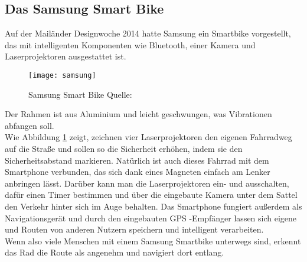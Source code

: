 \subsection{Das Samsung Smart Bike}
Auf der Mailänder Designwoche 2014 hatte Samsung ein Smartbike vorgestellt, das mit intelligenten Komponenten wie Bluetooth, einer Kamera und Laserprojektoren ausgestattet ist.\\ 
\begin{figure}[H]
    \centering
    \texttt{[image: samsung]}
    \grayRule
    \caption[Samsung Smart Bike]{Samsung Smart Bike  Quelle: \cite{smartbike}} 
    \label{fig:samsung}
\end{figure}
Der Rahmen ist aus Aluminium und leicht geschwungen, was Vibrationen abfangen soll.\\
Wie Abbildung \ref{fig:samsung} zeigt, zeichnen vier Laserprojektoren den eigenen Fahrradweg auf die Straße und sollen so die Sicherheit erhöhen, indem sie den Sicherheitsabstand markieren. Natürlich ist auch dieses Fahrrad mit dem \gls{Smartphone} verbunden, das sich dank eines Magneten einfach am Lenker anbringen lässt. Darüber kann man die Laserprojektoren ein- und ausschalten, dafür einen Timer bestimmen und über die eingebaute Kamera unter dem Sattel den Verkehr hinter sich im Auge behalten. Das \gls{Smartphone} fungiert außerdem als Navigationsgerät und durch den eingebauten \gls{GPS} -Empfänger lassen sich eigene und Routen von anderen Nutzern speichern und intelligent verarbeiten. \cite{smartbike}\\ 
Wenn also viele Menschen mit einem Samsung Smartbike unterwegs sind, erkennt das Rad die Route als angenehm und navigiert dort entlang.
